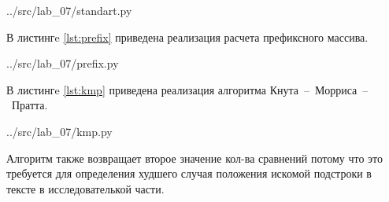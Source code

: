 \begin{lstinputlisting}[
	label={lst:standart},
	caption={Стандартный алгоритм},
	]{../src/lab_07/standart.py}
\end{lstinputlisting}

В листингe \ref{lst:prefix} приведена реализация расчета префиксного массива.

\begin{lstinputlisting}[
	label={lst:prefix},
	caption={Получение префиксного массива},
	]{../src/lab_07/prefix.py}
\end{lstinputlisting}

\newpage
В листингe \ref{lst:kmp} приведена реализация алгоритма Кнута~--~Морриса~--~Пратта.
\begin{lstinputlisting}[
	label={lst:kmp},
	firstline=4,
	caption={Алгоритм Кнута~--~Морриса~--~Пратта},
	]{../src/lab_07/kmp.py}
\end{lstinputlisting}

Алгоритм также возвращает второе значение кол-ва сравнений потому что это требуется для определения худшего случая положения искомой подстроки в тексте в исследователькой части.